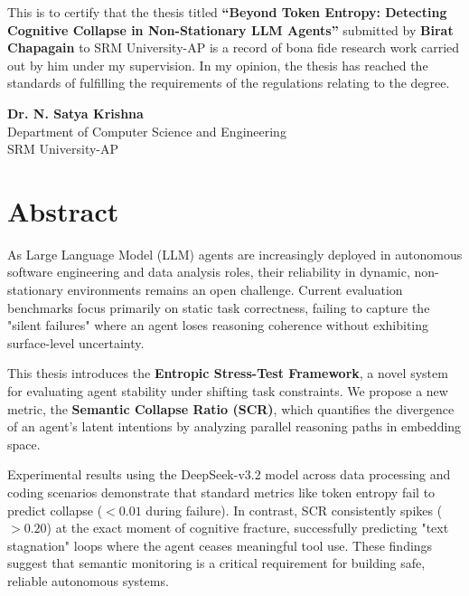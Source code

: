 \documentclass[12pt,a4paper]{report}
\begin{document}
        

        This is to certify that the thesis titled \textbf{``Beyond Token Entropy: Detecting Cognitive Collapse in Non-Stationary LLM Agents''} submitted by \textbf{Birat Chapagain} to SRM University-AP is a record of bona fide research work carried out by him under my supervision. In my opinion, the thesis has reached the standards of fulfilling the requirements of the regulations relating to the degree.

        

        

        

        \vspace{3cm}

        

        \noindent

        

        \textbf{Dr. N. Satya Krishna}\\

        

        Department of Computer Science and Engineering\\

        

        SRM University-AP

\chapter*{Abstract}
As Large Language Model (LLM) agents are increasingly deployed in autonomous software engineering and data analysis roles, their reliability in dynamic, non-stationary environments remains an open challenge. Current evaluation benchmarks focus primarily on static task correctness, failing to capture the "silent failures" where an agent loses reasoning coherence without exhibiting surface-level uncertainty.

This thesis introduces the \textbf{Entropic Stress-Test Framework}, a novel system for evaluating agent stability under shifting task constraints. We propose a new metric, the \textbf{Semantic Collapse Ratio (SCR)}, which quantifies the divergence of an agent's latent intentions by analyzing parallel reasoning paths in embedding space.

Experimental results using the DeepSeek-v3.2 model across data processing and coding scenarios demonstrate that standard metrics like token entropy fail to predict collapse ($<0.01$ during failure). In contrast, SCR consistently spikes ($>0.20$) at the exact moment of cognitive fracture, successfully predicting "text stagnation" loops where the agent ceases meaningful tool use. These findings suggest that semantic monitoring is a critical requirement for building safe, reliable autonomous systems.
\end{document}
